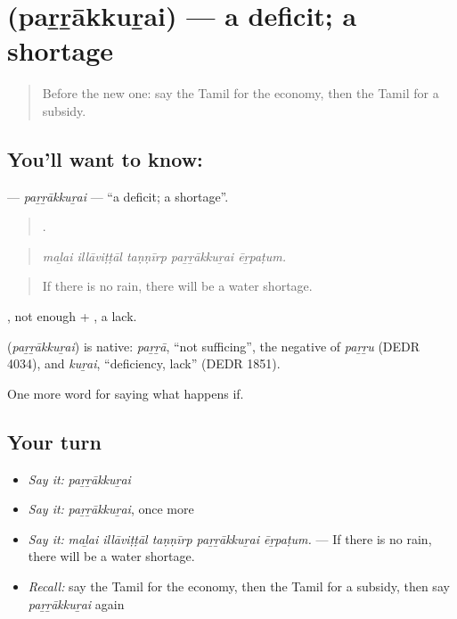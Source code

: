 \section[\texorpdfstring{\ta{பற்றாக்குறை} (paṟṟākkuṟai)}{பற்றாக்குறை (paṟṟākkuṟai)}]{ (paṟṟākkuṟai) — a deficit; a shortage}

\label{lesson:TA-C391-parrakkurai}



\begin{quote}
Before the new one: say the Tamil for the economy, then the Tamil for a subsidy.
\end{quote}

\subsection*{You'll want to know: }
\textbf{} — \emph{paṟṟākkuṟai} — \textquotedblleft{}a deficit; a shortage\textquotedblright{}.

\begin{quote}
    .
\end{quote}

\begin{quote}
\emph{maḻai illāviṭṭāl taṇṇīrp paṟṟākkuṟai ēṟpaṭum.}
\end{quote}

\begin{quote}
If there is no rain, there will be a water shortage.
\end{quote}

, not enough + , a lack.

\begin{cousinweb}
\textbf{} (\emph{paṟṟākkuṟai}) is native: \emph{paṟṟā}, \textquotedblleft{}not sufficing\textquotedblright{}, the negative of \emph{paṟṟu} (DEDR 4034), and \emph{kuṟai}, \textquotedblleft{}deficiency, lack\textquotedblright{} (DEDR 1851).
\end{cousinweb}

\begin{grammarlens}[title={What you've built}]
One more word for saying what happens if.
\end{grammarlens}

\subsection*{Your turn}
\begin{itemize}
\raggedright
  \item \emph{Say it:} \emph{paṟṟākkuṟai}
  \item \emph{Say it:} \emph{paṟṟākkuṟai}, once more
  \item \emph{Say it:} \emph{maḻai illāviṭṭāl taṇṇīrp paṟṟākkuṟai ēṟpaṭum.} — If there is no rain, there will be a water shortage.
  \item \emph{Recall:} say the Tamil for the economy, then the Tamil for a subsidy, then say \emph{paṟṟākkuṟai} again
\end{itemize}

